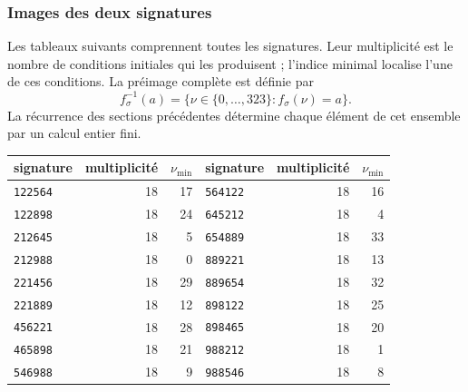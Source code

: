 \subsubsection{Images des deux signatures}

Les tableaux suivants comprennent toutes les signatures. Leur multiplicité est le
nombre de conditions initiales qui les produisent ; l'indice minimal localise
l'une de ces conditions. La préimage complète est définie par
\[
 f_\sigma^{-1}(a)=\{\nu\in\{0,\ldots,323\}:f_\sigma(\nu)=a\}.
\]
La récurrence des sections précédentes détermine chaque élément de cet
ensemble par un calcul entier fini.

\begin{tablacompleta}[htbp]
\caption{Les dix-huit signatures additives.}
\label{tpk:firmas-aditivas}
\begin{tabular}{@{}lrr@{\qquad}lrr@{}}
\toprule
signature&multiplicité&\(\nu_{\min}\)&signature&multiplicité&\(\nu_{\min}\)\\
\midrule
\texttt{122564}&18&17&\texttt{564122}&18&16\\
\texttt{122898}&18&24&\texttt{645212}&18&4\\
\texttt{212645}&18&5&\texttt{654889}&18&33\\
\texttt{212988}&18&0&\texttt{889221}&18&13\\
\texttt{221456}&18&29&\texttt{889654}&18&32\\
\texttt{221889}&18&12&\texttt{898122}&18&25\\
\texttt{456221}&18&28&\texttt{898465}&18&20\\
\texttt{465898}&18&21&\texttt{988212}&18&1\\
\texttt{546988}&18&9&\texttt{988546}&18&8\\
\bottomrule
\end{tabular}
\end{tablacompleta}

